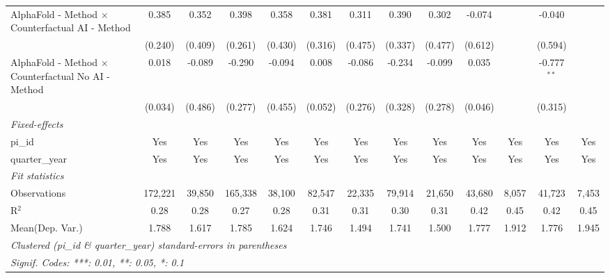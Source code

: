 \begin{tabular}{lcccccccccccc}
   AlphaFold - Method $\times$ Counterfactual AI - Method     & 0.385   & 0.352         & 0.398   & 0.358         & 0.381   & 0.311         & 0.390   & 0.302        & -0.074  &         & -0.040        &   \\   
                                                              & (0.240) & (0.409)       & (0.261) & (0.430)       & (0.316) & (0.475)       & (0.337) & (0.477)      & (0.612) &         & (0.594)       &   \\   
   AlphaFold - Method $\times$ Counterfactual No AI - Method  & 0.018   & -0.089        & -0.290  & -0.094        & 0.008   & -0.086        & -0.234  & -0.099       & 0.035   &         & -0.777$^{**}$ &   \\   
                                                              & (0.034) & (0.486)       & (0.277) & (0.455)       & (0.052) & (0.276)       & (0.328) & (0.278)      & (0.046) &         & (0.315)       &   \\   
   \midrule
   \emph{Fixed-effects}\\
   pi\_id                                                     & Yes     & Yes           & Yes     & Yes           & Yes     & Yes           & Yes     & Yes          & Yes     & Yes     & Yes           & Yes\\  
   quarter\_year                                              & Yes     & Yes           & Yes     & Yes           & Yes     & Yes           & Yes     & Yes          & Yes     & Yes     & Yes           & Yes\\  
   \midrule
   \emph{Fit statistics}\\
   Observations                                               & 172,221 & 39,850        & 165,338 & 38,100        & 82,547  & 22,335        & 79,914  & 21,650       & 43,680  & 8,057   & 41,723        & 7,453\\  
   R$^2$                                                      & 0.28    & 0.28          & 0.27    & 0.28          & 0.31    & 0.31          & 0.30    & 0.31         & 0.42    & 0.45    & 0.42          & 0.45\\  
Mean(Dep. Var.) & 1.788 & 1.617 & 1.785 & 1.624 & 1.746 & 1.494 & 1.741 & 1.500 & 1.777 & 1.912 & 1.776 & 1.945 \\
   \midrule \midrule
   \multicolumn{13}{l}{\emph{Clustered (pi\_id \& quarter\_year) standard-errors in parentheses}}\\
   \multicolumn{13}{l}{\emph{Signif. Codes: ***: 0.01, **: 0.05, *: 0.1}}\\
\end{tabular}
\par\endgroup
